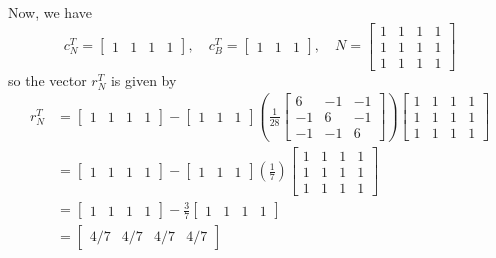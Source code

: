 \documentclass{article}
\begin{document}
\begin{enumerate}
\begin{enumerate}[a)]
\begin{soln}
					Now, we have \[c_N^T = \begin{bmatrix}
							1 & 1 & 1 & 1
						\end{bmatrix}, \quad c_B^T = \begin{bmatrix}
							1 & 1 & 1
						\end{bmatrix}, \quad N=\begin{bmatrix}
							1 & 1 & 1 & 1 \\
							1 & 1 & 1 & 1 \\
							1 & 1 & 1 & 1
					\end{bmatrix}\] so the vector $r_N^T$ is given by 
					\begin{align*}
						r_N^T &= \begin{bmatrix}
							1 & 1 & 1 & 1	
						\end{bmatrix} - \begin{bmatrix}
							1 & 1 & 1
						\end{bmatrix}\left( \frac{1}{28}\begin{bmatrix}
							6 & -1 & -1 \\
							-1 & 6 & -1 \\
							-1 & -1 & 6
						\end{bmatrix}\right)\begin{bmatrix}
							1 & 1 & 1 & 1 \\
							1 & 1 & 1 & 1 \\
							1 & 1 & 1 & 1 
						\end{bmatrix} \\
						&=\begin{bmatrix}
							1 & 1 & 1 & 1
						\end{bmatrix} - \begin{bmatrix}
							1 & 1 & 1
						\end{bmatrix}\left( \frac{1}{7} \right)\begin{bmatrix}
							1 & 1 & 1 & 1 \\
							1 & 1 & 1 & 1 \\
							1 & 1 & 1 & 1
						\end{bmatrix} \\
						&= \begin{bmatrix}
							1 & 1 & 1 & 1
						\end{bmatrix} - \frac{3}{7}\begin{bmatrix}
							1 & 1 & 1 & 1
						\end{bmatrix} \\
						&= \begin{bmatrix}
							4/7 & 4/7 & 4/7 & 4/7
						\end{bmatrix}
					\end{align*}


\end{soln}
\end{enumerate}
\end{enumerate}
\end{document}
